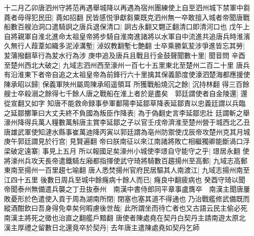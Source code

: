 十二月乙卯唐泗州守將范再遇舉城降以再遇為宿州團練使上自至泗州城下禁軍中芻蕘者毋得犯民田|{
	蕘如招翻}
民皆感悦爭獻芻粟既克泗州無一卒敢擅入城者帝聞唐戰船數百艘泊洞口遣騎詗之唐兵退保清口|{
	詗古永翻又翾正翻清口即清河口也}
戊午上自將親軍自淮北進命太祖皇帝將步騎自淮南進諸將以水軍自中流進共追唐兵時淮濱久無行人葭葦如織多泥淖溝塹|{
	淖奴教翻塹七艶翻}
士卒乘勝氣苃涉爭進皆忘其勞|{
	苃蒲撥翻草行為苃水行為涉}
庚申追及唐兵且戰且行金鼓聲聞數十里|{
	聞音問}
辛酉至楚州西北大破之|{
	九域志泗州西至濠州一百七十五里東北至楚州二百二十里}
唐兵有沿淮東下者帝自追之太祖皇帝為前鋒行六十里擒其保義節度使濠泗楚海都應援使陳承昭以歸|{
	保義軍陜州屬周陳承昭遥領耳}
所獲戰船燒沉之餘|{
	沉持林翻}
得三百餘艘士卒殺溺之餘得七千餘人唐之戰船在淮上者於是盡矣　郭廷謂使者自金陵還|{
	還從宣翻又如字}
知唐不能救命録事參軍鄱陽李延鄒草降表延鄒責以忠義廷謂以兵臨之延鄒擲筆曰大丈夫終不負國為叛臣作降表|{
	為于偽翻史言李延鄒忠壯}
廷謂斬之舉濠州降得兵萬人糧數萬斛唐主賞李延鄒之子以官壬戌帝濟淮至楚州營于城西北乙丑唐雄武軍使知漣水縣事崔萬迪降丙寅以郭廷謂為亳州防禦使戊辰帝攻楚州克其月城庚午郭廷謂見於行宫|{
	見賢遍翻}
帝曰朕南征以來江南諸將敗亡相繼獨卿能斷渦口浮梁破定遠寨|{
	事見上五月}
所以報國足矣濠州小城使李璟自守能守之乎|{
	璟居永翻}
使將濠州兵攻天長帝遣鐵騎左廂都指揮使武守琦將騎數百趨揚州至高郵|{
	九域志高郵東南至揚州一百里趨七喻翻}
唐人悉焚揚州官府民居驅其人南渡江|{
	九域志揚州南至江四十五里}
後數日周兵至城中餘癃病十餘人而已|{
	癃良中翻疲病也}
癸酉守琦以聞帝聞泰州無備遣兵襲之丁丑抜泰州　南漢中書侍郎同平章事盧膺卒　南漢主聞唐屢敗憂形於色遣使入貢于周為湖南所閉|{
	閉塞也塞其道不得通也}
乃治戰艦修武備既而縱酒酣飲曰吾身得免幸矣何暇慮後世哉|{
	此所謂坐而待亡者也又古語云民主偷必死南漢主將死之徵也治直之翻艦戶黯翻}
唐使者陳處堯在契丹白契丹主請南遊太原北漢主厚禮之留數日北還竟卒於契丹|{
	去年唐主遣陳處堯如契丹乞師}


